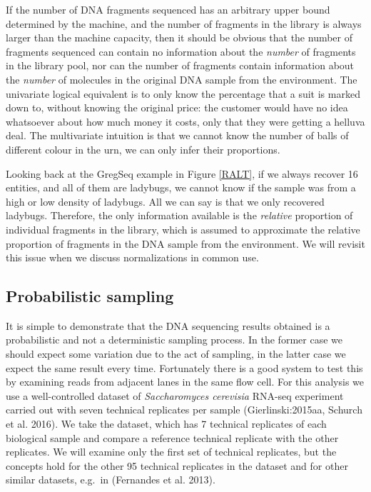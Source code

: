 \documentclass[onecolumn]{article}
\begin{document}
If the number of DNA fragments sequenced has an arbitrary upper bound determined by the machine, and the number of fragments in the library is always larger than the machine capacity, then it should be obvious that the number of fragments sequenced can contain no information about the \emph{number} of fragments in the library pool, nor can the number of fragments contain information about the \emph{number} of molecules in the original DNA sample from the environment. The univariate logical equivalent is to only know the percentage that a suit is marked down to, without knowing the original price: the customer would have no idea whatsoever about how much money it costs, only that they were getting a helluva deal. The multivariate intuition is that we cannot know the number of balls of different colour in the urn, we can only infer their proportions.

Looking back at the GregSeq example in Figure \ref{RALT}, if we always recover 16 entities, and all of them are ladybugs, we cannot know if the sample was from a high or low density of ladybugs. All we can say is that we only recovered ladybugs. Therefore, the only information available is the \emph{relative} proportion of individual fragments in the library, which is assumed to approximate the relative proportion of fragments in the DNA sample from the environment. We will revisit this issue when we discuss normalizations in common use.

\hypertarget{probabilistic-sampling}{%
\subsection{Probabilistic sampling}\label{probabilistic-sampling}}

It is simple to demonstrate that the DNA sequencing results obtained is a probabilistic and not a deterministic sampling process. In the former case we should expect some variation due to the act of sampling, in the latter case we expect the same result every time. Fortunately there is a good system to test this by examining reads from adjacent lanes in the same flow cell. For this analysis we use a well-controlled dataset of \emph{Saccharomyces cerevisia} RNA-seq experiment carried out with seven technical replicates per sample (Gierlinski:2015aa, Schurch et al. 2016). We take the dataset, which has 7 technical replicates of each biological sample and compare a reference technical replicate with the other replicates. We will examine only the first set of technical replicates, but the concepts hold for the other 95 technical replicates in the dataset and for other similar datasets, e.g.~in (Fernandes et al. 2013).
\end{document}
